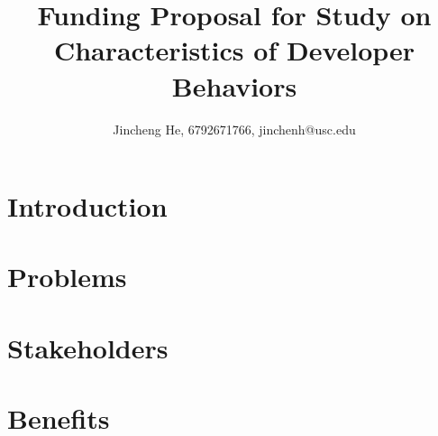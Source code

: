 \documentclass[a4paper,12pt]{article}
\title{Funding Proposal for Study on Characteristics of Developer Behaviors}
\author{Jincheng He, 6792671766, jinchenh@usc.edu}
\begin{document}
\maketitle

\section{Introduction}
\section{Problems}
\section{Stakeholders}
\section{Benefits}
\end{document}

